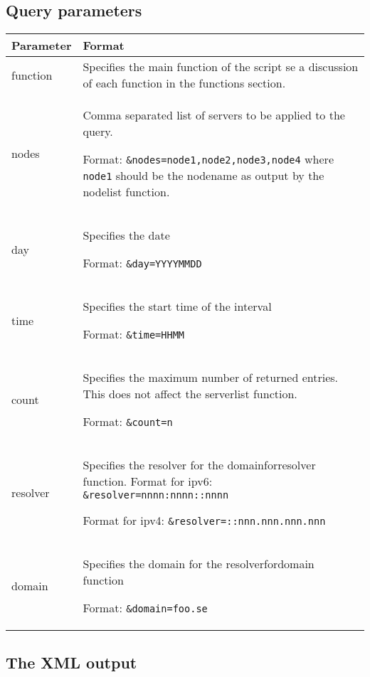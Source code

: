 \documentclass[a4paper]{article}
\begin{document}
\subsection{Query parameters}
\begin{center}
    \begin{tabular}{ | l | p{10cm} |}
    \hline
    \textbf{Parameter} & \textbf{Format}  \\ \hline
    
    function & 
    Specifies the main function of the script se a discussion of each function in the functions section. 
    \\ \hline

    nodes &  Comma separated list of servers to be applied to the query.
    
    Format: \verb|&nodes=node1,node2,node3,node4|
    where \verb|node1| should be the nodename as output by the nodelist function. 
    \\ \hline

    day & Specifies the date

    Format: \verb|&day=YYYYMMDD|
    \\ \hline

    time & Specifies the start time of the interval

    Format: \verb|&time=HHMM| 
    \\ \hline

    count & Specifies the maximum number of returned entries. This does not affect the serverlist function.

    Format: \verb|&count=n|
    \\ \hline

    resolver & 
    Specifies the resolver for the domainforresolver function.
    \linebreak Format for ipv6: \verb|&resolver=nnnn:nnnn::nnnn| 
    
    
    Format for ipv4: \verb|&resolver=::nnn.nnn.nnn.nnn|
    \\ \hline

    domain & 
    Specifies the domain for the resolverfordomain function

    Format: \verb|&domain=foo.se|
    \\ \hline
    \end{tabular}
\end{center}


\newpage

\subsection{The XML output}
\end{document}
